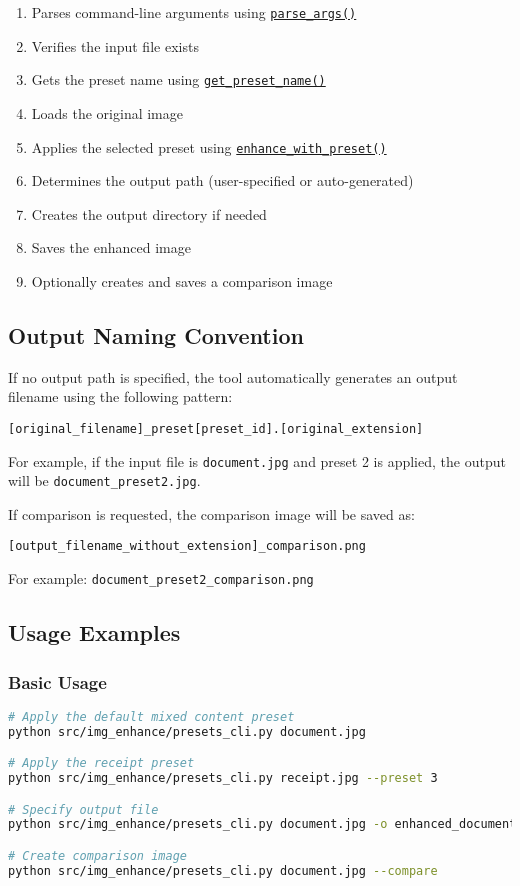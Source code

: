 \begin{enumerate}
    \item Parses command-line arguments using \hyperref[sec:presets_cli_args]{\texttt{parse\_args()}}
    \item Verifies the input file exists
    \item Gets the preset name using \hyperref[sec:get_preset_name]{\texttt{get\_preset\_name()}}
    \item Loads the original image
    \item Applies the selected preset using \hyperref[sec:enhance_with_preset]{\texttt{enhance\_with\_preset()}}
    \item Determines the output path (user-specified or auto-generated)
    \item Creates the output directory if needed
    \item Saves the enhanced image
    \item Optionally creates and saves a comparison image
\end{enumerate}

\subsection{Output Naming Convention}
If no output path is specified, the tool automatically generates an output filename using the following pattern:
\begin{verbatim}
[original_filename]_preset[preset_id].[original_extension]
\end{verbatim}

For example, if the input file is \texttt{document.jpg} and preset 2 is applied, the output will be \texttt{document\_preset2.jpg}.

If comparison is requested, the comparison image will be saved as:
\begin{verbatim}
[output_filename_without_extension]_comparison.png
\end{verbatim}

For example: \texttt{document\_preset2\_comparison.png}

\subsection{Usage Examples}

\subsubsection{Basic Usage}
\begin{lstlisting}[language=Bash, caption=Basic CLI Usage]
# Apply the default mixed content preset
python src/img_enhance/presets_cli.py document.jpg

# Apply the receipt preset
python src/img_enhance/presets_cli.py receipt.jpg --preset 3

# Specify output file
python src/img_enhance/presets_cli.py document.jpg -o enhanced_document.jpg

# Create comparison image
python src/img_enhance/presets_cli.py document.jpg --compare
\end{lstlisting}


